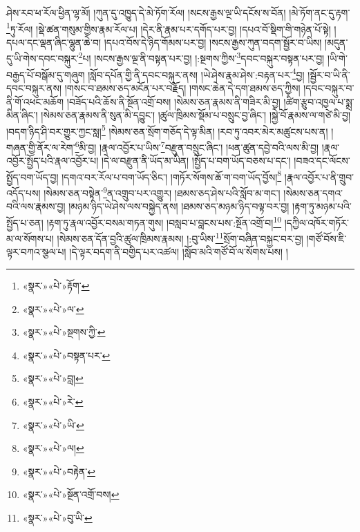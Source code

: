 ཤེས་རབ་ཕ་རོལ་ཕྱིན་ལྷ་མོ། །ཀུན་དུ་འཁྱུད་དེ་མེ་ཏོག་རོལ། །སངས་རྒྱས་ལྔ་ཡི་དངོས་ས་བོན། །མེ་ཏོག་ནང་དུ་རྟག་\footnote{«སྣར་»«པེ་»རྟོག་}ཏུ་རོལ། །སྡེ་ཚན་གསུམ་གྱིས་རྣམ་རོལ་པ། །དེར་ནི་རྣམ་པར་དགོད་པར་བྱ། །དཔའ་བོ་སྡིག་གི་གཉེན་པོ་སྟེ། །དཔལ་དང་ལྡན་ཞིང་ལྷུན་ཆེ་བ། །དཔའ་བོས་དེ་ཉིད་གོམས་པར་བྱ། །སངས་རྒྱས་ཀུན་བདག་སྦྱོར་བ་ཡིས། །མདུན་དུ་ཡི་གེས་དབང་བསྐུར་\footnote{«སྣར་»«པེ་»ལ་}པ། །སངས་རྒྱས་ལྔ་ནི་བསྟན་པར་བྱ། །:སྔགས་ཀྱིས་\footnote{«སྣར་»«པེ་»སྔགས་ཀྱི་}དབང་བསྐུར་བསྟན་པར་བྱ། །ཡི་གེ་བརྒྱད་པོ་བསྒོམ་དུ་གཞུག །སློབ་དཔོན་གྱི་ནི་དབང་བསྐུར་ནས། །ཡེ་ཤེས་རྣམ་ཤེས་:བརྟན་པར་\footnote{«སྣར་»«པེ་»བསྟན་པར་}བྱ། །སྦྱོར་བ་ཡི་ནི་དབང་བསྐུར་ནས། །གསང་བ་ཐམས་ཅད་མངོན་པར་བརྗོད། །གསང་ཆེན་དེ་དག་ཐམས་ཅད་ཀྱིས། །དབང་བསྐུར་བ་ནི་གོ་འཕང་མཆོག །བཟོད་པའི་ཆོས་ནི་སྔོན་འགྲོ་བས། །སེམས་ཅན་རྣམས་ནི་གཟིར་མི་བྱ། །ཚིག་རྩུབ་འཁྱལ་པ་སྨྲ་མིན་ཞིང་། །སེམས་ཅན་རྣམས་ནི་སུན་མི་དབྱུང་། །ཚུལ་ཁྲིམས་སྡོམ་པ་བསྲུང་བྱ་ཞིང་། །སྐྱེ་བོ་རྣམས་ལ་གཙེ་མི་བྱ། །བདག་ཉིད་ཤི་བར་གྱུར་ཀྱང་སླ།\footnote{«སྣར་»«པེ་»བླ།} །སེམས་ཅན་སྲོག་གཅོད་དེ་ལྟ་མིན། །རབ་ཏུ་འབར་མེར་མཚུངས་པས་ན། །གཞན་གྱི་ནོར་ལ་རེག་\footnote{«སྣར་»«པེ་»རེ་}མི་བྱ། །རྣལ་འབྱོར་པ་ཡིས་\footnote{«སྣར་»«པེ་»ཡི་}བརྫུན་བསྲུང་ཞིང་། །ཕན་ཚུན་དབྱེ་བའི་ལས་མི་བྱ། །རྣལ་འབྱོར་སྤྱོད་པའི་རྣལ་འབྱོར་པ། །དེ་ལ་བརྫུན་ནི་ཡོད་མ་ཡིན། །སྤྱོད་པ་བག་ཡོད་བཅས་པ་དང་། །བཟའ་དང་ལོངས་སྤྱོད་བག་ཡོད་བྱ། །དགའ་བར་རོལ་པ་བག་ཡོད་ཅིང་། །གཏོར་སོགས་ཆོ་ག་བག་ཡོད་བྱོས།\footnote{«སྣར་»«པེ་»ལ།} །རྣལ་འབྱོར་པ་ནི་གྲུབ་འདོད་པས། །སེམས་ཅན་བསྟེན་\footnote{«སྣར་»«པེ་»བརྟེན་}ན་འགྲུབ་པར་འགྱུར། །ཐམས་ཅད་ཤེས་པའི་སློབ་མ་གང་། །སེམས་ཅན་དགའ་བའི་ལས་རྣམས་བྱ། །མཉམ་ཉིད་ཡེ་ཤེས་ལས་བསྐྱེད་ནས། །ཐམས་ཅད་མཉམ་ཉིད་བལྟ་བར་བྱ། །རྟག་ཏུ་མཉམ་པའི་སྤྱོད་པ་ཅན། །རྟག་ཏུ་རྣལ་འབྱོར་བསམ་གཏན་གུས། །བསླབ་པ་བླངས་པས་:སྔོན་འགྲོ་བ།\footnote{«སྣར་»«པེ་»སྔོན་འགྲོ་བས།} །དཀྱིལ་འཁོར་གཏོར་མ་ལ་སོགས་པ། །སེམས་ཅན་དོན་བྱའི་ཚུལ་ཁྲིམས་རྣམས། །:བུ་ཡིས་\footnote{«སྣར་»«པེ་»བུ་ཡི་}སྲོག་བཞིན་བསྐྱང་བར་བྱ། །གཙོ་བོས་ཇི་ལྟར་བཀའ་སྩལ་པ། །དེ་ལྟར་བདག་ནི་བགྱིད་པར་འཚལ། །སློབ་མའི་གཙོ་བོ་ལ་སོགས་པས། །

